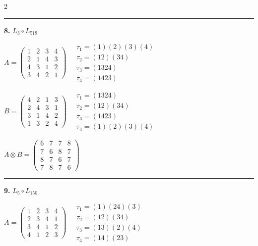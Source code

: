 \begin{multicols}{2}
\vspace{0.3em}
\hrule
\vspace{0.3em}

\noindent\textbf{8.} $L_{3} \circ L_{519}$

$A = \begin{pmatrix} 1 & 2 & 3 & 4 \\ 2 & 1 & 4 & 3 \\ 4 & 3 & 1 & 2 \\ 3 & 4 & 2 & 1 \end{pmatrix} \quad \begin{matrix} \tau_{1}=(1)(2)(3)(4) \\ \tau_{2}=(1 2)(3 4) \\ \tau_{3}=(1 3 2 4) \\ \tau_{4}=(1 4 2 3) \end{matrix}$

$B = \begin{pmatrix} 4 & 2 & 1 & 3 \\ 2 & 4 & 3 & 1 \\ 3 & 1 & 4 & 2 \\ 1 & 3 & 2 & 4 \end{pmatrix} \quad \begin{matrix} \tau_{1}=(1 3 2 4) \\ \tau_{2}=(1 2)(3 4) \\ \tau_{3}=(1 4 2 3) \\ \tau_{4}=(1)(2)(3)(4) \end{matrix}$

$A \otimes B = \begin{pmatrix} 6 & 7 & 7 & 8 \\ 7 & 6 & 8 & 7 \\ 8 & 7 & 6 & 7 \\ 7 & 8 & 7 & 6 \end{pmatrix}$

\vspace{0.3em}
\hrule
\vspace{0.3em}

\noindent\textbf{9.} $L_{5} \circ L_{150}$

$A = \begin{pmatrix} 1 & 2 & 3 & 4 \\ 2 & 3 & 4 & 1 \\ 3 & 4 & 1 & 2 \\ 4 & 1 & 2 & 3 \end{pmatrix} \quad \begin{matrix} \tau_{1}=(1)(2 4)(3) \\ \tau_{2}=(1 2)(3 4) \\ \tau_{3}=(1 3)(2)(4) \\ \tau_{4}=(1 4)(2 3) \end{matrix}$


\end{multicols}
